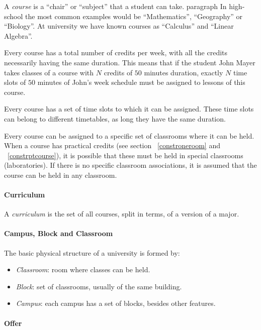 A \textit{course} is a ``chair'' or ``subject'' that a student can take.
paragraph
In high-school the most common examples would be ``Mathematics'', ``Geography'' or ``Biology''. At university we have known courses as ``Calculus'' and ``Linear Algebra''.

Every course has a total number of credits per week, with all the credits necessarily having the same duration. This means that if the student John Mayer takes classes of a course with $N$ credits of $50$ minutes duration, exactly $N$ time slots of $50$ minutes of John's week schedule must be assigned to lessons of this course.

Every course has a set of time slots to which it can be assigned. These time slots can belong to different timetables, as long they have the same duration.

Every course can be assigned to a specific set of classrooms where it can be held. When a course has practical credits (see section ~\ref{constroneroom} and ~\ref{constrptcourse}), it is possible that these must be held in special classrooms (laboratories). If there is no specific classroom associations, it is assumed that the course can be held in any classroom.



\paragraph{Curriculum}
\label{defcurric}

A \textit{curriculum} is the set of all courses, split in terms, of a version of a major.


\paragraph{Campus, Block and Classroom}
\label{defclassroom}

The basic physical structure of a university is formed by:
\begin{itemize}
\item \textit{Classroom}: room where classes can be held.
\item \textit{Block}: set of classrooms, usually of the same building.
\item \textit{Campus}: each campus has a set of blocks, besides other features.
\end{itemize}


\paragraph{Offer}
\label{defoffer}
 
